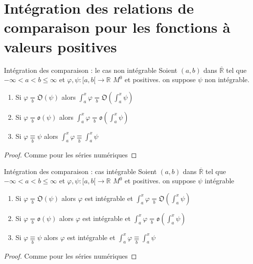 \documentclass[11pt,hidelinks]{book}
\theoremstyle{mytheoremstyle}
\theoremstyle{mytheoremstyle}
\theoremstyle{mytheoremstyle}
\theoremstyle{mytheoremstyle}
\theoremstyle{mytheoremstyle}
\theoremstyle{mytheoremstyle}
\theoremstyle{mytheoremstyle}
\theoremstyle{mytheoremstyle}
\theoremstyle{myproblemstyle}
\def\mbb#1{\mathbb{#1}}
\def\mfk#1{\mathfrak{#1}}
\def\bR{\mbb{R}}
\newcommand{\func}[3]{#1\colon#2\to#3}
\newcommand{\parenth}[1]{\left(#1\right)}
\begin{document}
\section{Intégration des relations de comparaison pour les fonctions à valeurs positives}
\begin{adjustwidth}{-2em}{-1em}
    \begin{theorem}{Intégration des comparaison : le cas non intégrable}
        Soient $(a,b)$ dans $\overline{\bR}$ tel que $-\infty < a < b \leq \infty$ et $\func{\varphi, \psi}{[a,b[}{\bR}$ $M^0$ et positives. on suppose $\psi$ 
        non intégrable.
        \begin{enumerate}
            \item Si $\varphi \underset{b}{=} \mfk{O}(\psi)$ alors $\int_{a}^{x} \varphi \underset{b}{=} \mfk{O}\parenth{\int_{a}^{x} \psi}$
            \item Si $\varphi \underset{b}{=} \mfk{o}(\psi)$ alors $\int_{a}^{x} \varphi \underset{b}{=} \mfk{o}\parenth{\int_{a}^{x} \psi}$
            \item Si $\varphi \underset{b}{\equiv} \psi$ alors $\int_{a}^{x} \varphi \underset{b}{\equiv} \int_{a}^{x} \psi$
        \end{enumerate} 
        \begin{proof}
            Comme pour les séries numériques 
        \end{proof}
    \end{theorem}
    \begin{theorem}{Intégration des comparaison : cas intégrable}
        Soient $(a,b)$ dans $\overline{\bR}$ tel que $-\infty < a < b \leq \infty$ et $\func{\varphi, \psi}{[a,b[}{\bR}$ $M^0$ et positives. on suppose $\psi$ 
        intégrable
        \begin{enumerate}
            \item Si $\varphi \underset{b}{=} \mfk{O}(\psi)$ alors $\varphi$ est intégrable et $\int_{a}^{x} \varphi \underset{b}{=} \mfk{O}\parenth{\int_{a}^{x} \psi}$
            \item Si $\varphi \underset{b}{=} \mfk{o}(\psi)$ alors $\varphi$ est intégrable et $\int_{a}^{x} \varphi \underset{b}{=} \mfk{o}\parenth{\int_{a}^{x} \psi}$
            \item Si $\varphi \underset{b}{\equiv} \psi$ alors $\varphi$ est intégrable et $\int_{a}^{x} \varphi \underset{b}{\equiv} \int_{a}^{x} \psi$
        \end{enumerate}
        \begin{proof}
            Comme pour les séries numériques
        \end{proof}
    \end{theorem}
\end{adjustwidth}
\end{document}
